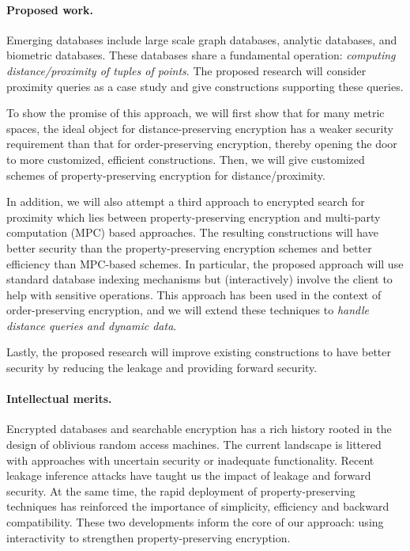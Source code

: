 \documentclass[11pt]{article}
\begin{document}
\paragraph{Proposed work.}
Emerging databases include large scale graph databases, analytic databases, and
biometric databases. These databases share a fundamental operation: {\em
computing distance/proximity of tuples of points}. The proposed research will
consider proximity queries as a case study and give constructions supporting
these queries. 

To show the promise of this approach, we will first show that for many metric
spaces, the ideal object for distance-preserving encryption has a weaker
security requirement than that for order-preserving encryption, thereby opening
the door to more customized, efficient constructions. Then, we will give
customized schemes of property-preserving encryption for distance/proximity. 

In addition, we will also attempt a third approach to encrypted search for
proximity which lies between property-preserving encryption and multi-party
computation (MPC) based approaches. The resulting constructions will have
better security than the property-preserving encryption schemes and better
efficiency than MPC-based schemes. In particular, the proposed approach will
use standard database indexing mechanisms but (interactively) involve the
client to help with sensitive operations. This approach has been used in the
context of order-preserving encryption, and we will extend these techniques to
{\em handle distance queries and dynamic data}.

Lastly, the proposed research will improve existing constructions to have
better security by reducing the leakage and providing forward security.  

%
%

\paragraph{Intellectual merits.}  
Encrypted databases and searchable encryption has a rich history rooted in the
design of oblivious random access machines.  The current landscape is littered
with approaches with uncertain security or inadequate functionality.  Recent
leakage inference attacks have taught us the impact of leakage and forward
security.  At the same time, the rapid deployment of property-preserving
techniques has reinforced the importance of simplicity, efficiency and backward
compatibility.  These two developments inform the core of our approach: using
interactivity to strengthen property-preserving encryption.
\end{document}
